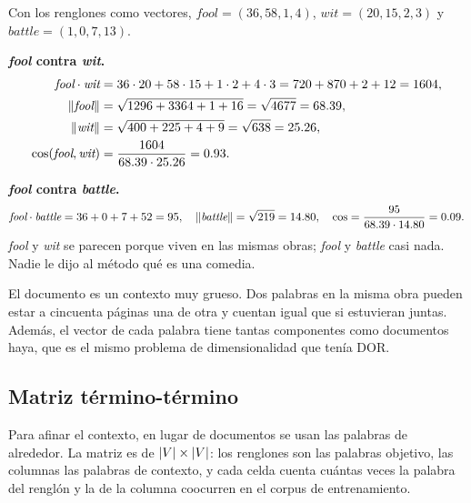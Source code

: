 \documentclass[11pt,letterpaper]{article}
\begin{document}
\begin{ejemplo}
    Con los renglones como vectores,
    $\textit{fool} = (36, 58, 1, 4)$,
    $\textit{wit} = (20, 15, 2, 3)$ y
    $\textit{battle} = (1, 0, 7, 13)$.

    \textbf{\textit{fool} contra \textit{wit}.}
    \begin{align*}
        \textit{fool} \cdot \textit{wit}
            &= 36 \cdot 20 + 58 \cdot 15 + 1 \cdot 2 + 4 \cdot 3
             = 720 + 870 + 2 + 12 = 1604 , \\
        \left\lVert \textit{fool} \right\rVert &= \sqrt{1296 + 3364 + 1 + 16}
             = \sqrt{4677} = 68.39 , \\
        \left\lVert \textit{wit} \right\rVert &= \sqrt{400 + 225 + 4 + 9}
             = \sqrt{638} = 25.26 , \\
        \cos(\textit{fool}, \textit{wit})
            &= \frac{1604}{68.39 \cdot 25.26} = 0.93 .
    \end{align*}

    \textbf{\textit{fool} contra \textit{battle}.}
    \[
        \textit{fool} \cdot \textit{battle} = 36 + 0 + 7 + 52 = 95 ,
        \quad
        \left\lVert \textit{battle} \right\rVert = \sqrt{219} = 14.80 ,
        \quad
        \cos = \frac{95}{68.39 \cdot 14.80} = 0.09 .
    \]
    \textit{fool} y \textit{wit} se parecen porque viven en las mismas
    obras; \textit{fool} y \textit{battle} casi nada. Nadie le dijo al
    método qué es una comedia.
\end{ejemplo}

\begin{ojo}
    El documento es un contexto muy grueso. Dos palabras en la misma
    obra pueden estar a cincuenta páginas una de otra y cuentan igual
    que si estuvieran juntas. Además, el vector de cada palabra tiene
    tantas componentes como documentos haya, que es el mismo problema
    de dimensionalidad que tenía DOR.
\end{ojo}


\subsection*{Matriz término-término}

Para afinar el contexto, en lugar de documentos se usan las palabras
de alrededor. La matriz es de $\left\lvert V \right\rvert \times \left\lvert V \right\rvert$: los renglones
son las palabras objetivo, las columnas las palabras de contexto, y
cada celda cuenta cuántas veces la palabra del renglón y la de la
columna coocurren en el corpus de entrenamiento.
\end{document}
